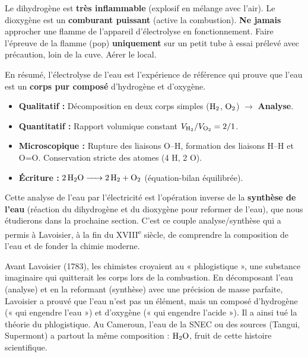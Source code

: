 \documentclass[11pt]{article}
\newcounter{popsec}
\newcounter{popsub}
\newcommand{\courssub}[1]{%
  \stepcounter{popsub}%
  \par\vspace{9pt}\noindent{\popxbold\fontsize{11.5}{13}\selectfont\color{popink}{\color{poporange}\thepopsec.\thepopsub}\hspace{6pt}#1}\par\nopagebreak\vspace{4pt}
}
\begin{document}
\begin{attention}
Le dihydrogène est \textbf{très inflammable} (explosif en mélange avec l'air). Le dioxygène est un \textbf{comburant puissant} (active la combustion). \textbf{Ne jamais} approcher une flamme de l'appareil d'électrolyse en fonctionnement. Faire l'épreuve de la flamme (pop) \textbf{uniquement} sur un petit tube à essai prélevé avec précaution, loin de la cuve. Aérer le local.
\end{attention}

\courssub{Conclusion : l'analyse de l'eau}

\noindent
En résumé, l'électrolyse de l'eau est l'expérience de référence qui prouve que l'eau est un \textbf{corps pur composé} d'hydrogène et d'oxygène.
\begin{itemize}
    \item \textbf{Qualitatif :} Décomposition en deux corps simples ($\ce{H2}$, $\ce{O2}$) $\rightarrow$ \textbf{Analyse}.
    \item \textbf{Quantitatif :} Rapport volumique constant $V_{\ce{H2}} / V_{\ce{O2}} = 2 / 1$.
    \item \textbf{Microscopique :} Rupture des liaisons O–H, formation des liaisons H–H et O=O. Conservation stricte des atomes (4 H, 2 O).
    \item \textbf{Écriture :} $\ce{2 H2O -> 2 H2 + O2}$ (équation-bilan équilibrée).
\end{itemize}

\noindent
Cette analyse de l'eau par l'électricité est l'opération inverse de la \textbf{synthèse de l'eau} (réaction du dihydrogène et du dioxygène pour reformer de l'eau), que nous étudierons dans la prochaine section. C'est ce couple analyse/synthèse qui a permis à Lavoisier, à la fin du XVIII\textsuperscript{e} siècle, de comprendre la composition de l'eau et de fonder la chimie moderne.

\begin{savaistu}
Avant Lavoisier (1783), les chimistes croyaient au « phlogistique », une substance imaginaire qui quitterait les corps lors de la combustion. En décomposant l'eau (analyse) et en la reformant (synthèse) avec une précision de masse parfaite, Lavoisier a prouvé que l'eau n'est pas un élément, mais un composé d'hydrogène (« qui engendre l'eau ») et d'oxygène (« qui engendre l'acide »). Il a ainsi tué la théorie du phlogistique. Au Cameroun, l'eau de la SNEC ou des sources (Tangui, Supermont) a partout la même composition : $\ce{H2O}$, fruit de cette histoire scientifique.
\end{savaistu}
\end{document}
